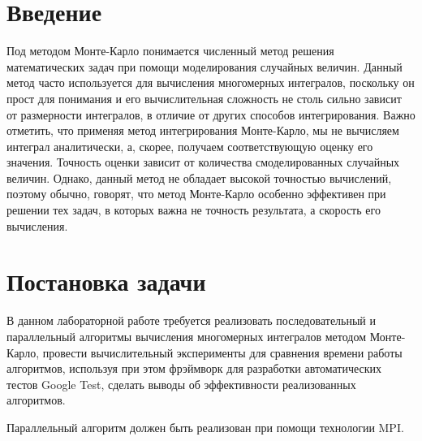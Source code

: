 \documentclass{report}
\begin{document}
\setcounter{page}{2}

\tableofcontents
\newpage

\section*{Введение}
\par Под методом Монте-Карло понимается численный метод решения математических задач при помощи моделирования случайных величин. Данный метод часто используется для вычисления многомерных интегралов, поскольку он прост для понимания и его вычислительная сложность не столь сильно зависит от размерности интегралов, в отличие от других способов интегрирования. Важно отметить, что применяя метод интегрирования Монте-Карло, мы не вычисляем интеграл аналитически, а, скорее, получаем соответствующую оценку его значения. Точность оценки зависит от количества смоделированных случайных величин. Однако, данный метод не обладает высокой точностью вычислений, поэтому обычно, говорят, что метод Монте-Карло особенно эффективен при решении тех задач, в которых важна не точность результата, а скорость его вычисления.
\newpage

\section*{Постановка задачи}
\par В данном лабораторной работе требуется реализовать последовательный и параллельный алгоритмы вычисления многомерных интегралов методом Монте-Карло, провести вычислительный эксперименты для сравнения времени работы алгоритмов, используя при этом фрэймворк для разработки автоматических тестов Google Test, сделать выводы об эффективности реализованных алгоритмов.
\par Параллельный алгоритм должен быть реализован при помощи технологии MPI.
\newpage

\end{document}
